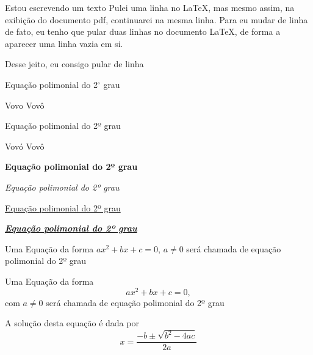 \documentclass[a4paper, 12pt]{article} %
\begin{document}

Estou escrevendo um texto
Pulei uma linha no LaTeX, mas mesmo assim, na exibição do documento pdf, continuarei na mesma linha. Para eu mudar de linha de fato, eu tenho que pular duas linhas no documento LaTeX, de forma a aparecer uma linha vazia em si. 

Desse jeito, eu consigo pular de linha

Equa\c c\~ao polimonial do 2$^\circ$ grau %

Vov\´o Vov\^o %

Equação polimonial do 2º grau %

Vovó Vovô

\begin{center} %
    \textbf{Equação polimonial do 2º grau} %
\end{center}

\begin{flushright} %
    \textit{Equação polimonial do 2º grau} %
\end{flushright}

\begin{flushleft} %
    \underline{Equação polimonial do 2º grau} %
\end{flushleft}

\begin{flushleft} %
    \textbf{\textit{\underline{Equação polimonial do 2º grau}}} %
\end{flushleft}

Uma Equação da forma $ax^2 + bx + c = 0$, $a \neq 0$ será chamada de equação polimonial do 2º grau %

Uma Equação da forma $$ax^2 + bx + c = 0,$$ com $a \neq 0$ será chamada de equação polimonial do 2º grau %

A solução desta equação é dada por
$$x = \frac{-b \pm \sqrt{b^2 - 4ac}}{2a}$$
\end{document}
